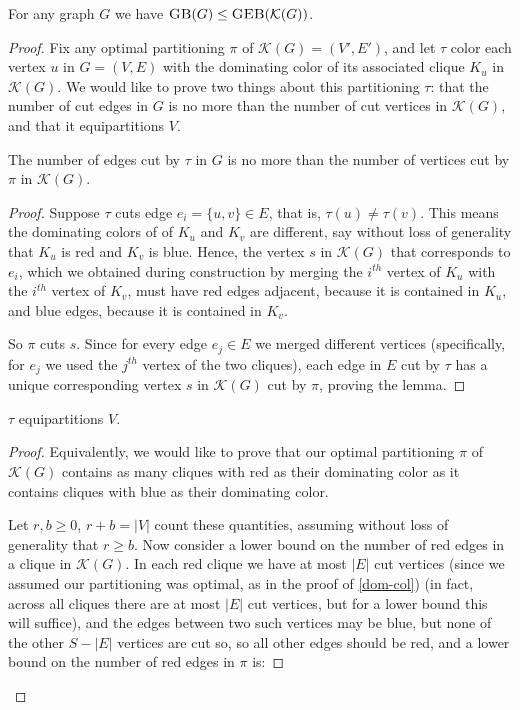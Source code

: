 \documentclass{article}
\newcommand{\sgeb}{\textsc{GEB} }
\newcommand{\sgb}{\textsc{GB} }
\begin{document}
	\begin{proposition}
		\label{gb-leq-geb}
		For any graph $G$ we have $\sgb(G) \leq \sgeb(\mathcal{K}(G))$.
	\end{proposition}
	\begin{proof}
		Fix any optimal partitioning $\pi$ of $\mathcal{K}(G) = (V', E')$, and
		let $\tau$ color each vertex $u$ in $G = (V, E)$ with the dominating
		color of its associated clique $K_u$ in $\mathcal{K}(G)$. We would
		like to
		prove two things about this partitioning $\tau$:
		that the number of cut edges in $G$ is no more than the number of
		cut vertices in $\mathcal{K}(G)$, and that it equipartitions $V$.


		\begin{lemma}
			\label{gb-leq-geb-lemma-1}
			The number of edges cut by $\tau$ in $G$ is no more than the number
			of vertices cut by $\pi$ in $\mathcal{K}(G)$.
		\end{lemma}
		\begin{proof}
			Suppose $\tau$ cuts edge $e_i = \{u, v\} \in E$, that is,
			$\tau(u) \neq \tau(v)$. This means the dominating colors of
			of $K_u$ and $K_v$ are different, say without loss of generality
			that $K_u$ is red and $K_v$ is blue. Hence, the vertex $s$ in
			$\mathcal{K}(G)$ that
			corresponds to $e_i$, which we obtained during construction
			by merging the $i^{th}$
			vertex of $K_u$ with the $i^{th}$ vertex of $K_v$, must have
			red edges adjacent, because it is contained in $K_u$, and blue
			edges, because it is contained in $K_v$.

			So $\pi$ cuts $s$.
			Since for every edge $e_j \in E$ we merged different
			vertices (specifically, for $e_j$ we used the $j^{th}$ vertex of
			the two cliques), each edge in $E$ cut by $\tau$ has a unique
			corresponding vertex $s$ in $\mathcal{K}(G)$ cut by $\pi$,
			proving the lemma.
		\end{proof}
		\begin{lemma}
			\label{gb-leq-geb-lemma-2}
			$\tau$ equipartitions $V$.
		\end{lemma}
		\begin{proof}
			Equivalently, we would like to prove that our optimal partitioning
			$\pi$ of $\mathcal{K}(G)$ contains as many cliques with red as
			their dominating color as it contains cliques with blue as their
			dominating color.

			Let $r,b \geq 0$, $r+b=|V|$ count these quantities, assuming
			without loss of generality that $r \geq b$. Now consider a lower
			bound on the number of red edges in a clique in $\mathcal{K}(G)$.
			In each red clique we have at most
			$|E|$ cut vertices (since we assumed our partitioning was optimal,
			as in the proof of \autoref{dom-col}) (in fact,
			across all cliques there are at most $|E|$ cut vertices, but for a
			lower bound this will suffice), and the edges between two such
			vertices may be blue, but none of the other $S - |E|$ vertices are
			cut so, so all other edges should be red, and a lower
			bound on the number of red edges in $\pi$ is:


\end{proof}
\end{proof}
\end{document}
